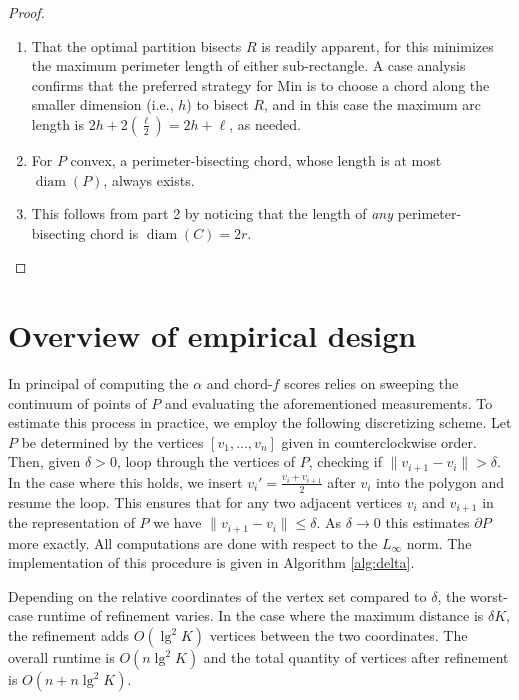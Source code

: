 \documentclass[]{jocg}
\newcommand{\norm}[1]{\|#1\|}
\DeclareMathOperator{\diam}{\mathrm{diam}}
\theoremstyle{definition}
\theoremstyle{remark}
\begin{document}
\begin{proof}
  \begin{enumerate}
    \item That the optimal partition bisects $R$ is readily apparent,
      for this minimizes the maximum perimeter length of either sub-rectangle.
      A case analysis confirms that the preferred strategy for Min is to choose
      a chord along the smaller dimension (i.e., $h$) to bisect $R$, and in this
      case the maximum arc length is $2h + 2\left( \frac{\ell}{2} \right) = 2h +
      \ell$, as needed.
    \item For $P$ convex, a perimeter-bisecting chord, whose length is at most
      $\diam(P)$, always exists. 
    \item This follows from part 2 by noticing that the length of \emph{any}
      perimeter-bisecting chord is $\diam(C) = 2r$. \qedhere
  \end{enumerate}
\end{proof}

\section{Overview of empirical design}

In principal of computing the $\alpha$ and chord-$f$ scores relies on sweeping
the continuum of points of $P$ and evaluating the aforementioned measurements.
To estimate this process in practice, we employ the following discretizing
scheme. Let $P$ be determined by the vertices $[v_1, \dots, v_n]$ given in
counterclockwise order. Then, given $\delta > 0$, loop through the vertices of
$P$, checking if $\norm{v_{i+1} - v_i} > \delta$. In the case where this holds,
we insert $v_i' = \frac{v_i + v_{i+1}}{2}$ after $v_i$ into the polygon and
resume the loop. This ensures that for any two adjacent vertices $v_{i}$ and
$v_{i+1}$ in the representation of $P$ we have $\norm{v_{i+1} - v_i} \leq
\delta$. As $\delta \to 0$ this estimates $\partial P$ more exactly. All
computations are done with respect to the $L_{\infty}$ norm. The implementation
of this procedure is given in Algorithm \ref{alg:delta}.

Depending on the relative coordinates of the vertex set compared to $\delta$,
the worst-case runtime of refinement varies. In the case where the maximum
distance is $\delta K$, the refinement adds $O(\lg^2 K)$ vertices between the
two coordinates. The overall runtime is $O(n \lg^2 K)$ and the total quantity of
vertices after refinement is $O(n + n\lg^2 K)$.
\end{document}
